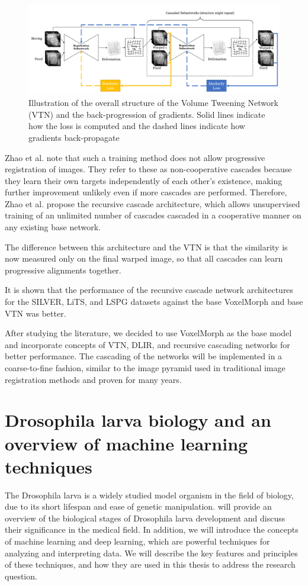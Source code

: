 \documentclass{book}
\begin{document}
	\begin{figure}[h!]
		\centering
		\includegraphics[width=\columnwidth]{resources/chapter2/vtn.png}
		\caption{Illustration of the overall structure of the Volume Tweening Network (VTN) and the back-progression of gradients. Solid lines indicate how the loss is computed and the dashed lines indicate how gradients back-propagate\cite{8889674}}
		\label{fig:vtn}
	\end{figure}
	
	Zhao et al. \cite{Zhao_2019} note that such a training method does not allow progressive registration of images. They refer to these as non-cooperative cascades because they learn their own targets independently of each other's existence, making further improvement unlikely even if more cascades are performed. Therefore, Zhao et al. \cite{Zhao_2019} propose the recursive cascade architecture, which allows unsupervised training of an unlimited number of cascades cascaded in a cooperative manner on any existing base network.
	
	The difference between this architecture and the VTN is that the similarity is now measured only on the final warped image, so that all cascades can learn progressive alignments together.
	
	It is shown that the performance of the recursive cascade network architectures for the SILVER, LiTS, and LSPG datasets against the base VoxelMorph and base VTN was better.
	
	
	After studying the literature, we decided to use VoxelMorph as the base model and incorporate concepts of VTN, DLIR, and recursive cascading networks for better performance. The cascading of the networks will be implemented in a coarse-to-fine fashion, similar to the image pyramid used in traditional image registration methods and proven for many years.

	\chapter{Drosophila larva biology and an overview of machine learning techniques}
	The Drosophila larva is a widely studied model organism in the field of biology, due to its short lifespan and ease of genetic manipulation. will provide an overview of the biological stages of Drosophila larva development and discuss their significance in the medical field. In addition, we will introduce the concepts of machine learning and deep learning, which are powerful techniques for analyzing and interpreting data. We will describe the key features and principles of these techniques, and how they are used in this thesis to address the research question.
	
\end{document}
